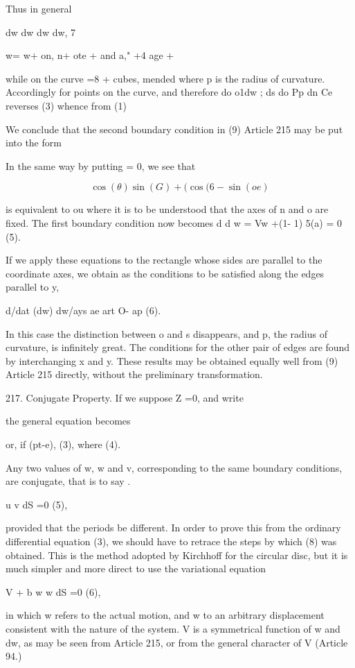 Thus in general

dw dw dw dw, 7

w= w+ on, n+ ote + and a," +4 age +

while on the curve =8 + cubes, mended where p is the
radius of curvature. Accordingly for points on the curve,
and therefore do o1dw ; ds do Pp dn Ce reverses (3) whence from (1)

We conclude that the second boundary condition in (9) Article 215 may be
put into the form

In the same way by putting = 0, we see that

\[\cos(\theta) \sin(G) + ( \cos(6 - \sin(oe)\]

is equivalent to ou where it is to be understood that the axes
of n and o are fixed. The first boundary condition now becomes
d d w = Vw +(1- 1) 5(a) = 0 (5).

If we apply these equations to the rectangle whose sides are parallel to
the coordinate axes, we obtain as the conditions to be satisfied along
the edges parallel to y,

d/dat (dw) dw/ays ae art O- ap (6).

In this case the distinction between o and s disappears, and p, the
radius of curvature, is infinitely great. The conditions for the other
pair of edges are found by interchanging x and y. These results may be
obtained equally well from (9) Article 215 directly, without the
preliminary transformation.

217. Conjugate Property.  If we suppose Z =0, and write

the general equation becomes

or, if (pt-e), (3), where (4).

Any two values of w, w and v, corresponding to the same boundary
conditions, are conjugate, that is to say .

u v dS =0 (5),

provided that the periods be different. In order to prove this from the
ordinary differential equation (3), we should have to retrace the steps
by which (8) was obtained. This is the method adopted by Kirchhoff for
the circular disc, but it is much simpler and more direct to use the
variational equation

V + b w w dS =0 (6),

in which w refers to the actual motion, and w to an arbitrary
displacement consistent with the nature of the system. V is a
symmetrical function of w and dw, as may be seen from Article 215, or
from the general character of V (Article 94.)


